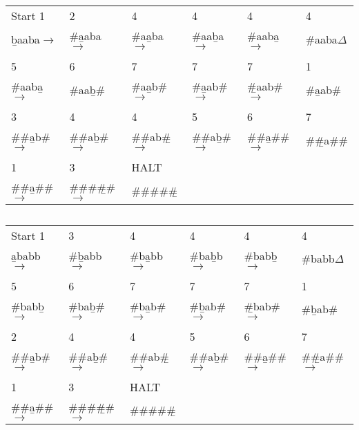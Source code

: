 \documentclass[12pt]{article}
\begin{document}
\subsection{}
\begin{tabular}{l l l l l l}
Start 1& 2& 4& 4& 4&4\\
\b{b}aaba$\rightarrow$ & \#\b{a}aba $\rightarrow$& \#a\b{a}ba $\rightarrow$& \#aa\b{b}a $\rightarrow$ & \#aab\b{a} $\rightarrow$ & \#aaba\b{$\Delta$}\\
&&&&&\\%
5& 6 & 7& 7& 7& 1\\
\#aab\b{a}$\rightarrow$&\#aa\b{b}\# & \#a\b{a}b\# $\rightarrow$ & \#\b{a}ab\# $\rightarrow$ & \b{\#}aab\# $\rightarrow$& \#\b{a}ab\# \\
&&&&&\\%
3&4&4&5& 6& 7\\
\#\#\b{a}b\# $\rightarrow$ & \#\#a\b{b}\# $\rightarrow$ & \#\#ab\b{\#} $\rightarrow$ & \#\#a\b{b}\# $\rightarrow$ & \#\#\b{a}\#\# $\rightarrow$ & \#\b{\#}a\#\#\\
&&&&&\\%
1&3 & HALT &&&\\
\#\#\b{a}\#\# $\rightarrow$ & \#\#\#\b{#}\# $\rightarrow$ & \#\#\#\#\b{\#} &&&\\
\end{tabular}
\subsection{}
\begin{tabular}{l l l l l l}
Start 1& 3& 4 & 4 & 4 & 4\\
\b{a}babb $\rightarrow$ & \#\b{b}abb $\rightarrow$ & \#b\b{a}bb $\rightarrow$ & \#ba\b{b}b $\rightarrow$ & \#bab\b{b} $\rightarrow$ & \#babb\b{$\Delta$}\\
&&&&&\\
5& 6 & 7 & 7 & 7 & 1\\
\#bab\b{b} $\rightarrow$ & \#ba\b{b}\# $\rightarrow$ & \#b\b{a}b\# $\rightarrow$ & \#\b{b}ab\# $\rightarrow$ & \b{\#}bab\# $\rightarrow$ & \#\b{b}ab\#\\
&&&&&\\
2 &4& 4 & 5 & 6 & 7\\
\#\#\b{a}b\# $\rightarrow$ & \#\#a\b{b}\# $\rightarrow$ & \#\#ab\b{\#} $\rightarrow$ & \#\#a\b{b}\# $\rightarrow$ & \#\#\b{a}\#\# $\rightarrow$ & \#\b{\#}a\#\# $\rightarrow$\\
&&&&&\\
1& 3 & HALT &&&\\
\#\#\b{a}\#\# $\rightarrow$ & \#\#\#\b{\#}\# $\rightarrow$ & \#\#\#\#\b{\#} &&&\\
\end{tabular}
\end{document}
